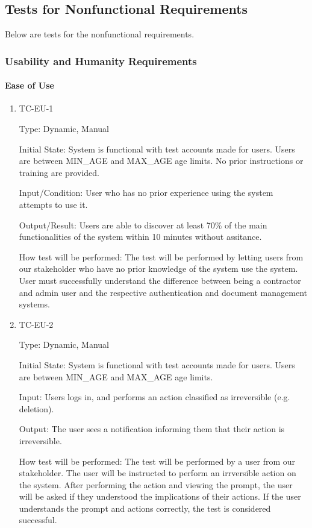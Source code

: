 \documentclass[12pt, titlepage]{article}
\begin{document}
\subsection{Tests for Nonfunctional Requirements}

Below are tests for the nonfunctional requirements.

\subsubsection{Usability and Humanity Requirements}

\paragraph{Ease of Use}

\begin{enumerate}

  \item{TC-EU-1\\}

    Type: Dynamic, Manual

    Initial State: System is functional with test accounts made for users. Users
    are between MIN\_AGE and MAX\_AGE age limits. No prior instructions or
    training are provided.

    Input/Condition: User who has no prior experience using the system attempts
    to use it.

    Output/Result: Users are able to discover at least 70\% of the main
    functionalities of the system within 10 minutes without assitance.

    How test will be performed: The test will be performed by letting users from
    our stakeholder who have no prior knowledge of the system use the system.
    User must successfully understand the difference between being a
    contractor and admin user
    and the respective authentication and document management systems.\\

  \item{TC-EU-2\\}

    Type: Dynamic, Manual

    Initial State: System is functional with test accounts made for users. Users
    are between MIN\_AGE and MAX\_AGE age limits.

    Input: Users logs in, and performs an action classified as irreversible
    (e.g. deletion).

    Output: The user sees a notification informing them that their action is
    irreversible.

    How test will be performed: The test will be performed by a user from our
    stakeholder. The user will be instructed to perform an irrversible action on
    the system. After performing the action and viewing the prompt, the user
    will be asked if they understood the implications of their actions. If the
    user understands the prompt and actions correctly, the test is considered
    successful.

\end{enumerate}
\end{document}
